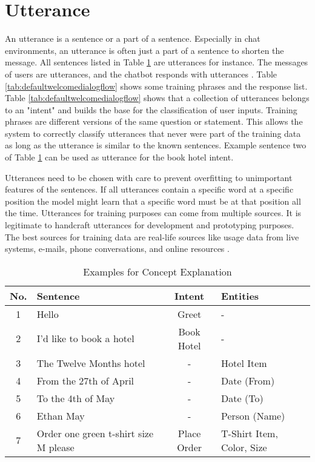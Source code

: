 \section{Utterance} \label{sec:utterance}
An utterance is a sentence or a part of a sentence.
Especially in chat environments, an utterance is often just a part of a sentence to shorten the message. 
All sentences listed in Table \ref{tab:example_sentences} are utterances for instance.
The messages of users are utterances, and the chatbot responds with utterances \cite{singhbuilding, dutta2017developing}.
Table \ref{tab:defaultwelcomedialogflow} shows some training phrases and the response list.
Table \ref{tab:defaultwelcomedialogflow} shows that a collection of utterances belongs to an "intent" and builds the base for the classification of user inputs.
Training phrases are different versions of the same question or statement.
This allows the system to correctly classify utterances that never were part of the training data as long as the utterance is similar to the known sentences.
Example sentence two of Table \ref{tab:example_sentences} can be used 
as utterance for the book hotel intent.

Utterances need to be chosen with care to prevent overfitting to unimportant features of the sentences.
If all utterances contain a specific word at a specific position the model 
might learn that a specific word must be at that position all the time.
Utterances for training purposes can come from multiple sources.
It is legitimate to handcraft utterances for development and prototyping purposes.
The best sources for training data are real-life sources like usage data from live systems, e-mails, phone conversations, and online resources \cite{singhbuilding}.    


\begin{table}[H]
    \centering
    \begin{tabular}{ c | l | c | l }
        No. & Sentence & Intent & Entities \\ \hline \hline
        1 & Hello & Greet & - \\ \hline
        2 & I'd like to book a hotel & Book Hotel & - \\ \hline
        3 & The Twelve Months hotel & - & Hotel Item\\ \hline
        4 & From the 27th of April & - & Date (From)\\ \hline
        5 & To the 4th of May & - & Date (To)\\ \hline
        6 & Ethan May & - & Person (Name)\\ \hline
        7 & Order one green t-shirt size M please & Place Order & T-Shirt Item, Color, Size \\ \hline
    \end{tabular}
    \caption{Examples for Concept Explanation} \label{tab:example_sentences}
\end{table} \noindent

